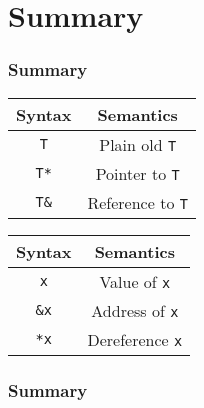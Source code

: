 \section{Summary}

\frame{\tableofcontents[currentsection]}

\begin{frame}
  \frametitle{Summary}
  \begin{center}
    \begin{tabular}{cc}
      \textbf{Syntax} & \textbf{Semantics} \\
      \toprule
      \texttt{T} & Plain old \texttt{T} \\
      \texttt{T*} & Pointer to \texttt{T} \\
      \texttt{T\&} & Reference to \texttt{T} \\
    \end{tabular}
  \end{center}
  \vskip4mm
  \begin{center}
    \begin{tabular}{cc}
      \textbf{Syntax} & \textbf{Semantics} \\
      \toprule
      \texttt{x} & Value of \texttt{x} \\
      \texttt{\&x} & Address of \texttt{x} \\
      \texttt{*x} & Dereference \texttt{x}
    \end{tabular}
  \end{center}
\end{frame}

\begin{frame}
  \frametitle{Summary}
\end{frame}
